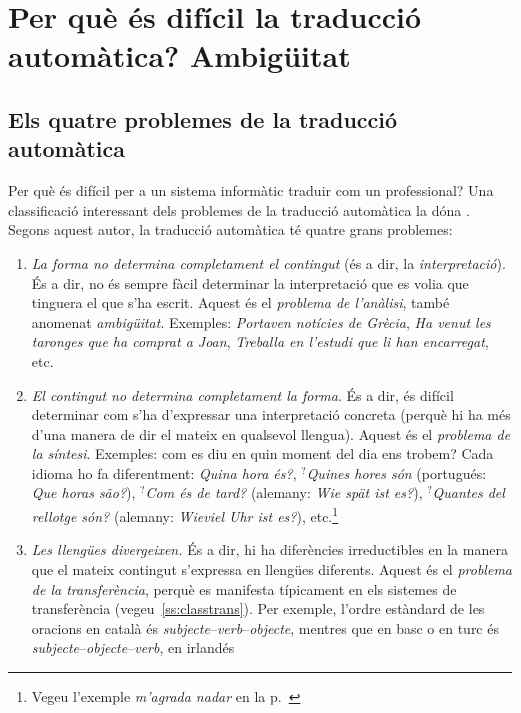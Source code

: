 \chapter[Per què és difícil la TA? Ambigüitat.]{Per què és difícil la traducció automàtica? Ambigüitat}
\label{se:ambig}


\section{Els quatre problemes de la traducció automàtica}

Per què és difícil per a un sistema informàtic traduir com un
professional?  Una classificació interessant dels problemes de la
traducció automàtica la dóna \cite{arnold03p}. Segons aquest autor, la traducció automàtica té quatre grans problemes:
\begin{enumerate}
\item \emph{La forma no determina completament el contingut} (és a
  dir, la \emph{interpretació}). És a dir, no és sempre fàcil
  determinar la interpretació que es volia que tinguera el que s'ha
  escrit. Aquest és el \emph{problema de l'anàlisi}, també anomenat
  \emph{ambigüitat}. Exemples:
  \emph{Portaven notícies de Grècia}, \emph{Ha venut les taronges que
    ha comprat a Joan}, \emph{Treballa en l'estudi que li han
    encarregat}, etc.
\item \emph{El contingut no determina completament la forma}. És a
  dir, és difícil determinar com s'ha d'expressar una interpretació
  concreta (perquè hi ha més d'una manera de dir el mateix en
  qualsevol llengua). Aquest és el \emph{problema de la
    síntesi}. Exemples: com es diu en quin moment del dia ens trobem?
  Cada idioma ho fa diferentment: \emph{Quina hora és?},
  $^?$\emph{Quines hores són} (portugués: \emph{Que horas são?}),
  $^?$\emph{Com és de tard?}  (alemany: \emph{Wie spät ist es?}),
  $^?$\emph{Quantes del rellotge són?} (alemany: \emph{Wieviel Uhr ist
    es?}), etc.\footnote{Vegeu l'exemple \emph{m'agrada nadar} en la p.~\pageref{pg:magradanadar}}
\item \emph{Les llengües divergeixen.} És a dir, hi ha diferències
  irreductibles en la manera que el mateix contingut s'expressa en
  llengües diferents. Aquest és el \emph{problema de la
    transferència}, perquè es manifesta típicament en els sistemes de
  transferència (vegeu~\ref{ss:classtrans}). Per exemple, l'ordre
  estàndard de les oracions en català és
  \emph{subjecte}--\emph{verb}--\emph{objecte}, mentres que en basc o
  en turc és \emph{subjecte}--\emph{objecte}--\emph{verb}, en irlandés

\end{enumerate}
